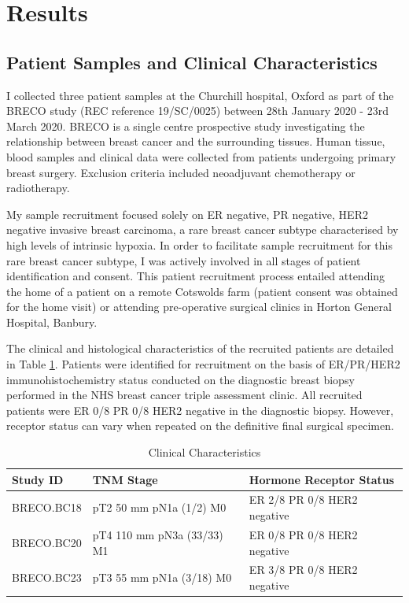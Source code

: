 \section{Results}


\subsection{Patient Samples and Clinical Characteristics}
I collected three patient samples at the Churchill hospital, Oxford as part of the BRECO study (REC reference 19/SC/0025) between 28th January 2020 - 23rd March 2020. BRECO is a single centre prospective study investigating the relationship between breast cancer and the surrounding tissues. Human tissue, blood samples and clinical data were collected from patients undergoing primary breast surgery. Exclusion criteria included neoadjuvant chemotherapy or radiotherapy.


My sample recruitment focused solely on ER negative, PR negative, HER2 negative invasive breast carcinoma, a rare breast cancer subtype characterised by high levels of intrinsic hypoxia. In order to facilitate sample recruitment for this rare breast cancer subtype, I was actively involved in all stages of patient identification and consent. This patient recruitment process entailed attending the home of a patient on a remote Cotswolds farm (patient consent was obtained for the home visit) or attending pre-operative surgical clinics in Horton General Hospital, Banbury.


The clinical and histological characteristics of the recruited patients are detailed in Table \ref{tab: clinical_characteristics}. Patients were identified for recruitment on the basis of ER/PR/HER2 immunohistochemistry status conducted on the diagnostic breast biopsy performed in the NHS breast cancer triple assessment clinic. All recruited patients were ER 0/8 PR 0/8 HER2 negative in the diagnostic biopsy. However, receptor status can vary when repeated on the definitive final surgical specimen.

\begin{table}
	\centering
	\begin{tabular}{l | l | l}
		Study ID & TNM Stage & Hormone Receptor Status \\
		\hline
		BRECO.BC18 & pT2 50 mm pN1a (1/2) M0 & ER 2/8 PR 0/8 HER2 negative \\
		BRECO.BC20 & pT4 110 mm pN3a (33/33) M1 & ER 0/8 PR 0/8 HER2 negative \\
		BRECO.BC23 & pT3 55 mm pN1a (3/18) M0 & ER 3/8 PR 0/8 HER2 negative \\
		\hline
	\end{tabular}
	\caption{Clinical Characteristics}
	\label{tab: clinical_characteristics}
\end{table}

